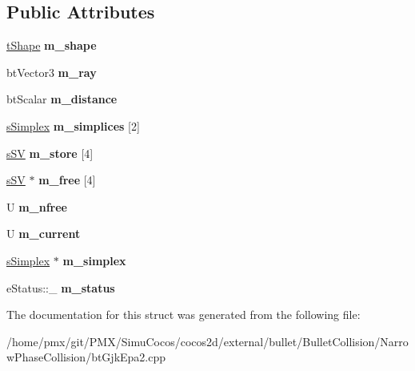\subsection*{Public Attributes}
\begin{DoxyCompactItemize}
\item 
\mbox{\label{structgjkepa2__impl_1_1GJK_aed2064fbd7bcb606163984823e07625e}} 
\hyperlink{structgjkepa2__impl_1_1MinkowskiDiff}{t\+Shape} {\bfseries m\+\_\+shape}
\item 
\mbox{\label{structgjkepa2__impl_1_1GJK_a8b7dead4b7fe812a502d5faeca7f944b}} 
bt\+Vector3 {\bfseries m\+\_\+ray}
\item 
\mbox{\label{structgjkepa2__impl_1_1GJK_a738c69f33e3dd567528b3f01bd23baa3}} 
bt\+Scalar {\bfseries m\+\_\+distance}
\item 
\mbox{\label{structgjkepa2__impl_1_1GJK_a49ad74413daf37bf2184e2c44b25c928}} 
\hyperlink{structgjkepa2__impl_1_1GJK_1_1sSimplex}{s\+Simplex} {\bfseries m\+\_\+simplices} \mbox{[}2\mbox{]}
\item 
\mbox{\label{structgjkepa2__impl_1_1GJK_a2f234473fc9ef2bfcbb894f591e3551f}} 
\hyperlink{structgjkepa2__impl_1_1GJK_1_1sSV}{s\+SV} {\bfseries m\+\_\+store} \mbox{[}4\mbox{]}
\item 
\mbox{\label{structgjkepa2__impl_1_1GJK_a82d589e14a87add03ea51b5a86224fa4}} 
\hyperlink{structgjkepa2__impl_1_1GJK_1_1sSV}{s\+SV} $\ast$ {\bfseries m\+\_\+free} \mbox{[}4\mbox{]}
\item 
\mbox{\label{structgjkepa2__impl_1_1GJK_af2d09f8a74f185dcb4e5d2c4e52375ae}} 
U {\bfseries m\+\_\+nfree}
\item 
\mbox{\label{structgjkepa2__impl_1_1GJK_ab156242bc169f7c70e541c035e8a0215}} 
U {\bfseries m\+\_\+current}
\item 
\mbox{\label{structgjkepa2__impl_1_1GJK_a4fcd4e88e5c7cb66dd29d86884602e15}} 
\hyperlink{structgjkepa2__impl_1_1GJK_1_1sSimplex}{s\+Simplex} $\ast$ {\bfseries m\+\_\+simplex}
\item 
\mbox{\label{structgjkepa2__impl_1_1GJK_a871d818da50b37e5585497005bc62e5c}} 
e\+Status\+::\+\_\+ {\bfseries m\+\_\+status}
\end{DoxyCompactItemize}


The documentation for this struct was generated from the following file\+:\begin{DoxyCompactItemize}
\item 
/home/pmx/git/\+P\+M\+X/\+Simu\+Cocos/cocos2d/external/bullet/\+Bullet\+Collision/\+Narrow\+Phase\+Collision/bt\+Gjk\+Epa2.\+cpp\end{DoxyCompactItemize}
